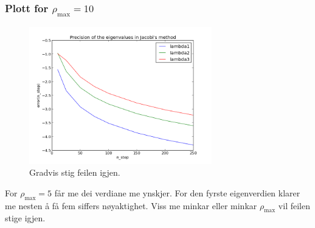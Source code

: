 \documentclass[11pt, a4paper]{article}
\begin{document}
    \subsubsection{Plott for $\rho_{\text{max}} = 10$}
      \begin{figure}[H]
        \centering
        \includegraphics[width=300px]{feil10.png}
        \caption{Gradvis stig feilen igjen.}
      \end{figure}

    For $\rho_{\text{max}} = 5$ får me dei verdiane me ynskjer. For den fyrste eigenverdien klarer me nesten å få fem siffers nøyaktighet. Viss me minkar eller minkar 
    $\rho_{\text{max}}$ vil feilen stige igjen.
\end{document}
